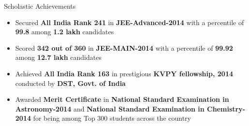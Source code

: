 \begin{rSection}{Scholastic Achievements}

\begin{itemize}[leftmargin=*]
	
	\itemsep \sepval

	\item Secured {\bf All India Rank 241} in {\bf JEE-Advanced-2014} with a percentile of {\bf 99.8} among {\bf 1.2 lakh} candidates
	
	\item Scored {\bf 342 out of 360} in {\bf JEE-MAIN-2014} with a percentile of {\bf 99.92} among {\bf 12.7 lakh} candidates

	\item  Achieved {\bf All India Rank 163} in prestigious {\bf KVPY fellowship, 2014} conducted by {\bf DST, Govt. of India}

	\item Awarded {\bf Merit Certificate} in {\bf National Standard Examination in Astronomy-2014} and 
	      {\bf National Standard Examination in Chemistry-2014} for being among Top 300 students across the country
	
\end{itemize}

\end{rSection}
